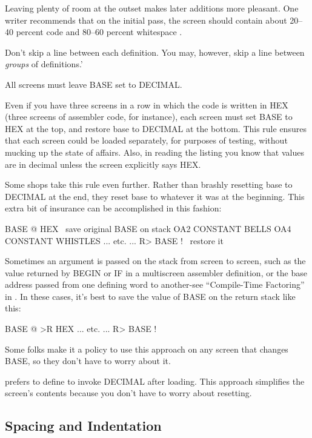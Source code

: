 Leaving plenty of room at the outset makes later additions more
pleasant.  One writer recommends that on the initial pass, the screen
should contain about 20--40 percent code and 80--60 percent whitespace \cite{stevenson81}.

Don't skip a line between each definition.  You may, however, skip a
line between \emph{groups} of definitions.'
\begin{tip}
All screens must leave BASE set to DECIMAL.
\end{tip}
Even if you have three screens in a row in which the code is written in
HEX (three screens of assembler code, for instance), each screen must set
BASE to HEX at the top, and restore base to DECIMAL at the bottom.
This rule ensures that each screen could be loaded separately, for purposes
of testing, without mucking up the state of affairs.  Also, in reading
the listing you know that values are in decimal unless the screen explicitly
says HEX.

Some shops take this rule even further.  Rather than brashly resetting
base to DECIMAL at the end, they reset base to whatever it was
at the beginning.  This extra bit of insurance can be accomplished in this
fashion:
\begin{Code}
BASE @          HEX     \ save original BASE on stack
OA2 CONSTANT BELLS
OA4 CONSTANT WHISTLES
... etc. ...
R> BASE !               \ restore it
\end{Code}

Sometimes an argument is passed on the stack from screen to screen,
such as the value returned by BEGIN or IF in a multiscreen assembler
definition, or the base address passed from one defining word to
another-see ``Compile-Time Factoring'' in .  In these cases,
it's best to save the value of BASE on
the return stack like this:
\begin{Code}
BASE @ >R HEX
... etc. ...
R> BASE !
\end{Code}

Some folks make it a policy to use this approach on any screen that
changes BASE, so they don't have to worry about it.

 prefers to define  to
invoke DECIMAL after loading.
This approach simplifies the screen's contents because you don't have to
worry about resetting.

\subsection{Spacing and Indentation}

